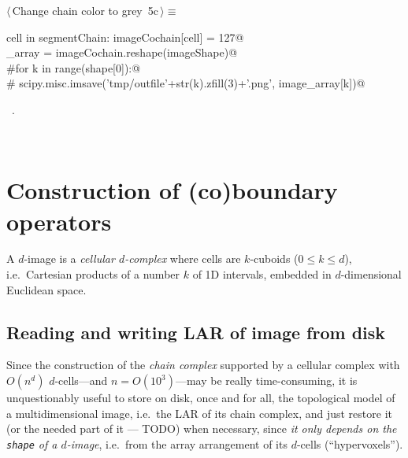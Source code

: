 \documentclass[11pt,oneside]{article}	%
\begin{document}
\begin{flushleft} \small
\begin{minipage}{\linewidth} \label{scrap8}
\protect{}$\langle\,$Change chain color to grey\nobreak\ {\footnotesize 5c}$\,\rangle\equiv$
\vspace{-1ex}
\begin{list}{}{} \item
\mbox{}\verb@for cell in segmentChain: imageCochain[cell] = 127@\\
\mbox{}\verb@image_array = imageCochain.reshape(imageShape)@\\
\mbox{}\verb@#for k in range(shape[0]):@\\
\mbox{}\verb@#  scipy.misc.imsave('tmp/outfile'+str(k).zfill(3)+'.png', image_array[k])@\\
\mbox{}\verb@@{\NWsep}
\end{list}
\vspace{-1ex}
\footnotesize\addtolength{\baselineskip}{-1ex}
\begin{list}{}{\setlength{\itemsep}{-\parsep}\setlength{\itemindent}{-\leftmargin}}
\item \NWtxtMacroRefIn\ .
\end{list}
\end{minipage}\\[4ex]
\end{flushleft}


\section{Construction of (co)boundary operators}

A $d$-image is a \emph{cellular $d$-complex} where cells are $k$-cuboids ($0\leq k\leq d$), i.e.~Cartesian products of a number $k$ of 1D intervals, embedded in $d$-dimensional Euclidean space. 


\subsection{Reading and writing LAR of image from disk}
Since the construction of the \emph{chain complex} supported by a cellular complex with $O(n^d)$ $d$-cells---and $n=O(10^3)$---may be really time-consuming, it is unquestionably useful to store on disk, once and for all, the topological model of a multidimensional image, i.e.~the LAR of its chain complex,  and just restore it (or the needed part of it --- TODO) when necessary, since \emph{it only depends on the \texttt{shape} of a $d$-image}, i.e.~from the array arrangement of its $d$-cells (``hypervoxels'').
\end{document}
